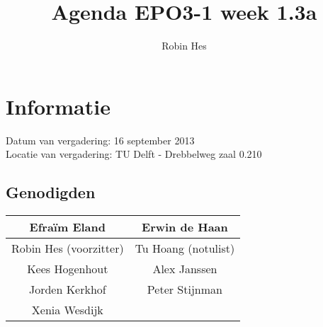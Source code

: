 \documentclass{article}
\begin{document}
\title{Agenda EPO3-1 week 1.3a}%
\author{Robin Hes}%
\maketitle

\section*{Informatie}
Datum van vergadering: 16 september 2013\\ %
Locatie van vergadering: TU Delft - Drebbelweg zaal 0.210 %
\subsection*{Genodigden}
\begin{center}
\begin{tabular}{|c |c |}
	\hline
	Efraïm Eland & Erwin de Haan \\
	\hline
	Robin Hes (voorzitter) & Tu Hoang (notulist)\\
	\hline
	Kees Hogenhout & Alex Janssen\\
	\hline
	Jorden Kerkhof & Peter Stijnman \\
	\hline
	Xenia Wesdijk & \\
	\hline
\end{tabular}
\end{center}
\end{document}
